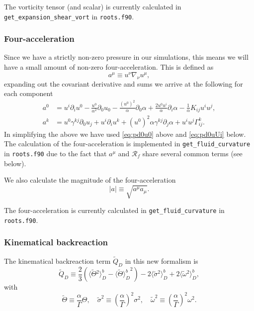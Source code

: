 \documentclass[a4paper]{article}
\newcommand{\alp}{\alpha}
\newcommand{\Gam}{\Gamma}
\newcommand{\gam}{\gamma}
\newcommand{\pd}{\partial}
\newcommand{\avgb}[1]{\langle #1 \rangle^b_D}
\begin{document}
The vorticity tensor (and scalar) is currently calculated in \texttt{get\_expansion\_shear\_vort} in \texttt{roots.f90}.


\subsubsection{Four-acceleration}

Since we have a strictly non-zero pressure in our simulations, this means we will have a small amount of non-zero four-acceleration. This is defined as
\begin{equation}
	a^\mu \equiv u^\nu \nabla_\nu u^\mu,
\end{equation}
expanding out the covariant derivative and sums we arrive at the following for each component
\begin{align}
	a^0 &= u^i \pd_i u^0 - \frac{u^0}{\alp^2}\pd_0 u_0 - \frac{(u^0)^2}{\alp}\pd_0\alp + \frac{2u^0u^i}{\alp} \pd_i\alp - \frac{1}{\alp}K_{ij}u^iu^j,\\
	a^k &= u^0 \gam^{kj}\pd_0 u_j + u^i \pd_i u^k + (u^0)^2\alp\gam^{kj}\pd_j\alp + u^i u^j \Gam^k_{ij}.
\end{align}
In simplifying the above we have used \eqref{eq:pd0u0} above and \eqref{eq:pd0uUi} below. The calculation of the four-acceleration is implemented in \texttt{get\_fluid\_curvature} in \texttt{roots.f90} due to the fact that $a^\mu$ and $\mathcal{R}_f$ share several common terms (see below).

We also calculate the magnitude of the four-acceleration
\begin{equation}
	|a| \equiv \sqrt{a^\mu a_\mu}.
\end{equation}

The four-acceleration is currently calculated in \texttt{get\_fluid\_curvature} in \texttt{roots.f90}.

\subsubsection{Kinematical backreaction}

The kinematical backreaction term $\tilde{Q}_D$ in this new formalism is
\begin{equation}\label{eq:QD}
	\tilde{Q}_D \equiv \frac{2}{3} \left( \avgb{\tilde{\Theta}{}^2} - {\avgb{\tilde{\Theta}}}^2 \right) - 2 \avgb{\tilde{\sigma}{}^2} + 2 \avgb{\tilde{\omega}{}^2},
\end{equation}
with
\begin{equation}\label{eq:tildes}
	\tilde{\Theta} \equiv \frac{\alpha}{\Gamma} \Theta, \quad \tilde{\sigma}^2 \equiv \left(\frac{\alpha}{\Gamma}\right)^2 \sigma^2, \quad \tilde{\omega}^2 \equiv \left(\frac{\alpha}{\Gamma}\right)^2 \omega^2.
\end{equation}
\end{document}

